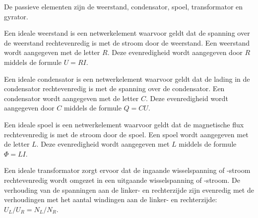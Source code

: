 De passieve elementen zijn de weerstand, condensator, spoel, transformator en gyrator.

\begin{minipage}{0.2\textwidth}
\centering
{}
\end{minipage}\hfill%
\begin{minipage}{0.78\textwidth}
Een ideale weerstand is een netwerkelement waarvoor geldt dat de spanning over de weerstand rechtevenredig is met de stroom door de weerstand. Een weerstand wordt aangegeven met de letter $R$. Deze evenredigheid wordt aangegeven door $R$ middels de formule $U=RI$.
\end{minipage}

\begin{minipage}{0.2\textwidth}
\centering
{}
\end{minipage}\hfill%
\begin{minipage}{0.78\textwidth}
Een ideale condensator is een netwerkelement waarvoor geldt dat de lading in de condensator rechtevenredig is met de spanning over de condensator. Een condensator wordt aangegeven met de letter $C$. Deze evenredigheid wordt aangegeven door $C$ middels de formule $Q=CU$.
\end{minipage}

\begin{minipage}{0.2\textwidth}
\centering
{}
\end{minipage}\hfill%
\begin{minipage}{0.78\textwidth}
Een ideale spoel is een netwerkelement waarvoor geldt dat de magnetische flux rechtevenredig is met de stroom door de spoel. Een spoel wordt aangegeven met de letter $L$. Deze evenredigheid wordt aangegeven met $L$ middels de formule $\Phi = LI$.
\end{minipage}

\begin{minipage}{0.2\textwidth}
\centering
{}
\end{minipage}\hfill%
\begin{minipage}{0.78\textwidth}
Een ideale transformator zorgt ervoor dat de ingaande wisselspanning of -stroom rechtevenredig wordt omgezet in een uitgaande wisselspanning of -stroom. De verhouding van de spanningen aan de linker- en rechterzijde zijn evenredig met de verhoudingen met het aantal windingen aan de linker- en rechterzijde: $U_L/U_R = N_L/N_R$.
\end{minipage}

